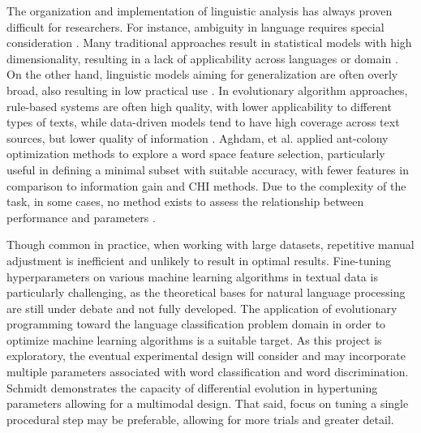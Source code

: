 \documentclass{article}
\begin{document}
The organization and implementation of linguistic analysis has always proven difficult for researchers. For instance, ambiguity in language requires special consideration \citep{bungum2010evolutionary}. Many traditional approaches result in statistical models with high dimensionality, resulting in a lack of applicability across languages or domain \citep{aghdam2009text}. On the other hand, linguistic models aiming for generalization are often overly broad, also resulting in low practical use \citep{nivre2015towards}. In evolutionary algorithm approaches, rule-based systems are often high quality, with lower applicability to different types of texts, while data-driven models tend to have high coverage across text sources, but lower quality of information \citep{bungum2010evolutionary}. Aghdam, et al. \citep{aghdam2009text} applied ant-colony optimization methods to explore a word space feature selection, particularly useful in defining a minimal subset with suitable accuracy, with fewer features in comparison to information gain and CHI methods. Due to the complexity of the task, in some cases, no method exists to assess the relationship between performance and parameters \citep{bungum2010evolutionary}. 

Though common in practice, when working with large datasets, repetitive manual adjustment is inefficient and unlikely to result in optimal results. Fine-tuning hyperparameters on various machine learning algorithms in textual data is particularly challenging, as the theoretical bases for natural language processing are still under debate and not fully developed. The application of evolutionary programming toward the language classification problem domain in order to optimize machine learning algorithms is a suitable target. As this project is exploratory, the eventual experimental design will consider and may incorporate multiple parameters associated with word classification and word discrimination. Schmidt \citep{schmidt2019performance} demonstrates the capacity of differential evolution in hypertuning parameters allowing for a multimodal design. That said, focus on tuning a single procedural step may be preferable, allowing for more trials and greater detail.
\end{document}
